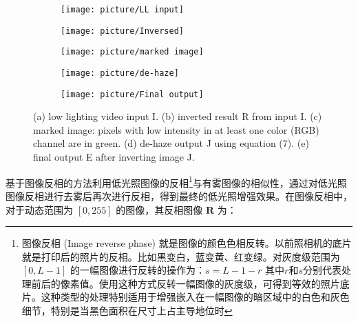 \documentclass[letterpaper,10pt]{article}
\begin{document}
		\begin{figure}[htbp] 
			\centering 
			
			\begin{subfigure}{0.18\textwidth}
				\texttt{[image: picture/LL input]}
				\captionsetup{font=scriptsize}
				\label{fig: LL input}
			\end{subfigure}
			\begin{subfigure}{0.18\textwidth}
				\texttt{[image: picture/Inversed]}
				\captionsetup{font=scriptsize}
				\label{fig: Inversed}
			\end{subfigure}
			\begin{subfigure}{0.18\textwidth}
				\texttt{[image: picture/marked image]}
				\captionsetup{font=scriptsize}
				\label{fig: marked image}	
			\end{subfigure}
			\begin{subfigure}{0.18\textwidth}
				\texttt{[image: picture/de-haze]}
				\captionsetup{font=scriptsize}
				\label{fig: de-haze}
			\end{subfigure}
			\begin{subfigure}{0.18\textwidth}
				\texttt{[image: picture/Final output]}
				\captionsetup{font=scriptsize}
				\label{fig: Final output}
			\end{subfigure}
			\captionsetup{font=scriptsize}
			\caption{
				\label{fig: Image Inverse}
				(a) low lighting video input I. (b) inverted result R from input I. (c) marked image: pixels with low intensity in at least one
				color (RGB) channel are in green. (d) de-haze output J using equation (7). (e) final output E after inverting image J.
			}
		\end{figure}
		
		基于图像反相的方法\cite{10.1145/1836845.1836920}利用低光照图像的反相\footnote{图像反相 (Image reverse phase) 就是图像的颜色色相反转。以前照相机的底片就是打印后的照片的反相。比如黑变白，蓝变黄、红变绿。对灰度级范围为 $[0 , L-1]$ 的一幅图像进行反转的操作为：$s = L - 1 - r$ 其中$r$和$s$分别代表处理前后的像素值。使用这种方式反转一幅图像的灰度级，可得到等效的照片底片。这种类型的处理特别适用于增强嵌入在一幅图像的暗区域中的白色和灰色细节，特别是当黑色面积在尺寸上占主导地位时}与有雾图像的相似性，通过对低光照图像反相进行去雾后再次进行反相，得到最终的低光照增强效果。在图像反相中，对于动态范围为 $[ 0, 255]$ 的图像，其反相图像 $\mathbf{R}$ 为： 
		
\end{document}
